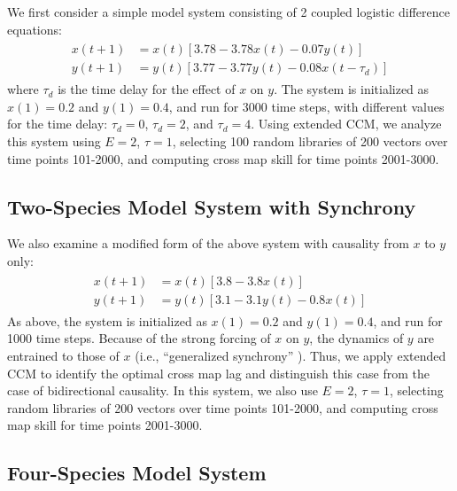 We first consider a simple model system consisting of 2 coupled logistic difference equations:
\begin{align}
\label{eqn_2sp_delay}
\begin{split}
x(t+1) &= x(t) \left[3.78 - 3.78 x(t) - 0.07 y(t)\right]\\
y(t+1) &= y(t) \left[3.77 - 3.77 y(t) - 0.08 x(t-\tau_d)\right]
\end{split}
\end{align}
where $\tau_d$ is the time delay for the effect of $x$ on $y$. The system is initialized as $x(1) = 0.2$ and $y(1) = 0.4$, and run for 3000 time steps, with different values for the time delay: $\tau_d = 0$, $\tau_d = 2$, and $\tau_d = 4$. Using extended CCM, we analyze this system using $E = 2$, $\tau = 1$, selecting 100 random libraries of 200 vectors over time points 101-2000, and computing cross map skill for time points 2001-3000.

\subsection{Two-Species Model System with Synchrony}

We also examine a modified form of the above system with causality from $x$ to $y$ only:
\begin{align}
\label{eqn_2sp_synch}
\begin{split}
x(t+1) &= x(t) \left[3.8 - 3.8 x(t)\right]\\
y(t+1) &= y(t) \left[3.1 - 3.1 y(t) - 0.8 x(t)\right]
\end{split}
\end{align}
As above, the system is initialized as $x(1) = 0.2$ and $y(1) = 0.4$, and run for 1000 time steps. Because of the strong forcing of $x$ on $y$, the dynamics of $y$ are entrained to those of $x$ (i.e., ``generalized synchrony'' \cite{Rulkov_1995}). Thus, we apply extended CCM to identify the optimal cross map lag and distinguish this case from the case of bidirectional causality. In this system, we also use $E = 2$, $\tau = 1$, selecting random libraries of 200 vectors over time points 101-2000, and computing cross map skill for time points 2001-3000.

\subsection{Four-Species Model System}

